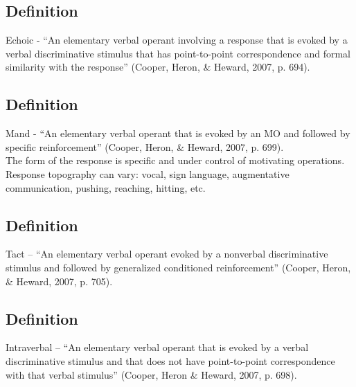 \subsection{Definition}  
Echoic - ``An elementary verbal operant involving a response that is evoked by a verbal discriminative stimulus that has point-to-point correspondence and formal similarity with the response'' (Cooper, Heron, \& Heward, 2007, p. 694).   
%
\subsection{Definition}
Mand - ``An elementary verbal operant that is evoked by an MO and followed by specific reinforcement'' (Cooper, Heron, \& Heward, 2007, p. 699).\\

The form of the response is specific and under control of motivating operations. Response topography can vary: vocal, sign language, augmentative communication, pushing, reaching, hitting, etc.
%
\subsection{Definition}
Tact – ``An elementary verbal operant evoked by a nonverbal discriminative stimulus and followed by generalized conditioned reinforcement'' (Cooper, Heron, \& Heward, 2007, p. 705).
%
\subsection{Definition} 
Intraverbal – ``An elementary verbal operant that is evoked by a verbal discriminative stimulus and that does not have point-to-point correspondence with that verbal stimulus'' (Cooper, Heron \& Heward, 2007, p. 698).
%
